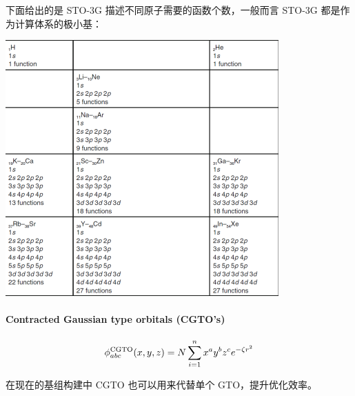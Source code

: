 下面给出的是 STO-3G 描述不同原子需要的函数个数，一般而言 STO-3G 都是作为计算体系的极小基：
\begin{center}
    \includegraphics[scale=0.7]{fig/lzhx/微信图片_20211102171332.png}
\end{center}

\paragraph*{Contracted Gaussian type orbitals (CGTO's)}
\[\phi_{abc}^{\rm{CGTO}}(x,y,z)=N\sum_{i=1}^n x^ay^bz^ce^{-\zeta r^2}\]

在现在的基组构建中 CGTO 也可以用来代替单个 GTO，提升优化效率。

